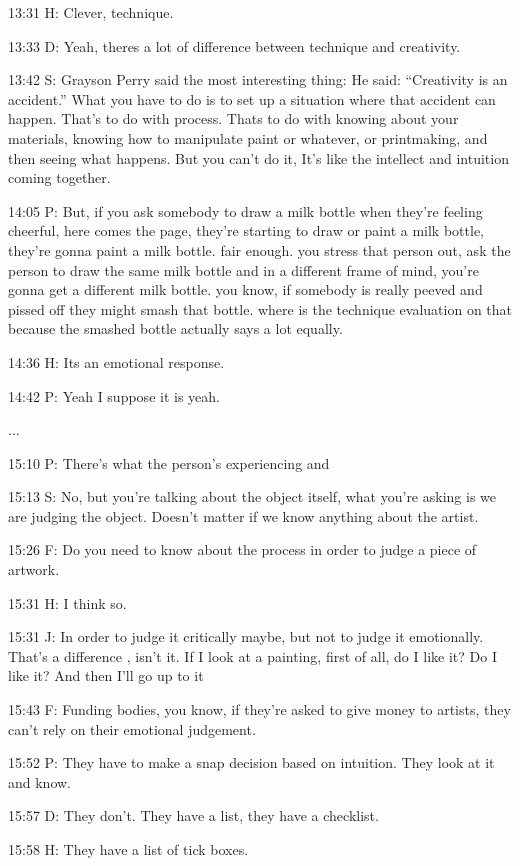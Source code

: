 13:31 H: Clever, technique.

13:33 D: Yeah, theres a lot of difference between technique and creativity.

13:42 S: Grayson Perry said the most interesting thing: He said: ``Creativity is an accident.'' What you have to do is to set up a situation where that accident can happen. That's to do with process. Thats to do with knowing about your materials, knowing how to manipulate paint or whatever, or printmaking, and then seeing what happens. But you can't do it, It's like the intellect and intuition coming together.

14:05 P: But, if you ask somebody to draw a milk bottle when they're feeling cheerful, here comes the page, they're starting to draw or paint a milk bottle, they're gonna paint a milk bottle. fair enough. you stress that person out, ask the person to draw the same milk bottle and in a different frame of mind, you're gonna get a different milk bottle. you know, if somebody is really peeved and pissed off they might smash that bottle. where is the technique evaluation on that because the smashed bottle actually says a lot equally.

14:36 H: Its an emotional response.

14:42 P: Yeah I suppose it is yeah.

...

15:10 P: There's what the person's experiencing and

15:13 S: No, but you're talking about the object itself, what you're asking is we are judging the object. Doesn't matter if we know anything about the artist.

15:26 F: Do you need to know about the process in order to judge a piece of artwork.

15:31 H: I think so.

15:31 J: In order to judge it critically maybe, but not to judge it emotionally. That's a difference , isn't it. If I look at a painting, first of all, do I like it? Do I like it? And then I'll go up to it

15:43 F: Funding bodies, you know, if they're asked to give money to artists, they can't rely on their emotional judgement.

15:52 P: They have to make a snap decision based on intuition. They look at it and know.

15:57 D: They don't. They have a list, they have a checklist.

15:58 H: They have a list of tick boxes.

